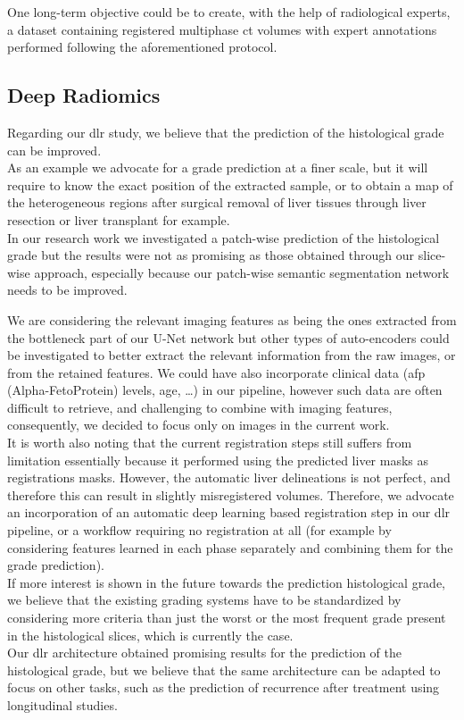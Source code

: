 One long-term objective could be to create, with the help of
radiological experts, a dataset containing registered multiphase \ac{ct}
volumes with expert annotations performed following the aforementioned
protocol.

\subsection{Deep Radiomics}

Regarding our \ac{dlr} study, we believe that the prediction of the
histological grade can be improved. \\
As an example we advocate for a grade prediction at a finer
scale, but it will require to know the exact position of the extracted
sample, or to obtain a map of the heterogeneous regions after surgical
removal of liver tissues through liver resection or liver transplant for
example.\\
In our research work we investigated a patch-wise prediction of the
histological grade but the results were not as promising as those
obtained through our slice-wise approach, especially because our
patch-wise semantic segmentation network needs to be improved.

We are considering the relevant imaging features as being the
ones extracted from the bottleneck part of our U-Net network but other
types of auto-encoders could be investigated to better
extract the relevant information from the raw images, or from the
retained features. We could have also incorporate clinical
data (\ac{afp} (Alpha-FetoProtein) levels, age, \ldots{}) in our pipeline, however such data are
often difficult to retrieve, and challenging to combine with imaging
features, consequently, we decided to focus only on images in the
current work.\\
It is worth also noting that the current registration steps still suffers from limitation
essentially because it performed using the predicted liver masks as registrations masks. However, the automatic liver delineations is not perfect, and therefore this can result in slightly misregistered volumes. Therefore, we advocate an incorporation of an automatic deep learning based registration step in our \ac{dlr} pipeline, or a workflow requiring no registration at all (for example by considering features learned in each phase separately and combining them for the grade prediction).\\
If more interest is shown in the future towards the prediction
histological grade, we believe that the existing grading systems have to
be standardized by considering more criteria than just the worst or the
most frequent grade present in the histological slices, which is
currently the case.\\
Our \ac{dlr} architecture obtained promising results for the prediction of
the histological grade, but we believe that the same architecture can be
adapted to focus on other tasks, such as the prediction of
recurrence after treatment using longitudinal studies.
